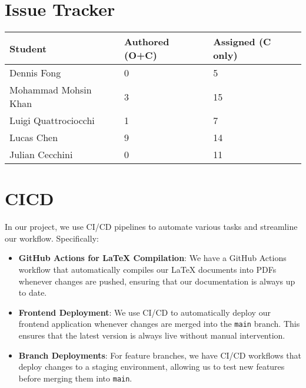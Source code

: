 \documentclass{article}
\begin{document}

\section{Issue Tracker}


\begin{table}[H]
\centering
\begin{tabular}{lll}
\toprule
\textbf{Student} & \textbf{Authored (O+C)} & \textbf{Assigned (C only)}\\
\midrule
Dennis Fong & 0 & 5 \\
Mohammad Mohsin Khan & 3 & 15 \\
Luigi Quattrociocchi & 1 & 7 \\
Lucas Chen & 9 & 14 \\
Julian Cecchini & 0 & 11 \\
\bottomrule
\end{tabular}
\end{table}


\section{CICD}

In our project, we use CI/CD pipelines to automate various tasks and streamline our workflow. Specifically:

\begin{itemize}
    \item \textbf{GitHub Actions for LaTeX Compilation}: We have a GitHub Actions workflow that automatically compiles our LaTeX documents into PDFs whenever changes are pushed, ensuring that our documentation is always up to date.
    \item \textbf{Frontend Deployment}: We use CI/CD to automatically deploy our frontend application whenever changes are merged into the \texttt{main} branch. This ensures that the latest version is always live without manual intervention.
    \item \textbf{Branch Deployments}: For feature branches, we have CI/CD workflows that deploy changes to a staging environment, allowing us to test new features before merging them into \texttt{main}.
\end{itemize}



\end{document}

